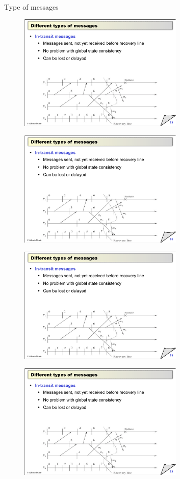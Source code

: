\begin{frame}{Type of messages}
\begin{overprint}
\begin{figure}
	\includegraphics[width=0.7\textwidth,page=4]{messages}
\end{figure}
\begin{figure}
	\includegraphics[width=0.7\textwidth,page=5]{messages}
\end{figure}
\begin{figure}
	\includegraphics[width=0.7\textwidth,page=6]{messages}
\end{figure}
\begin{figure}
	\includegraphics[width=0.7\textwidth,page=7]{messages}

\end{figure}
\end{overprint}
\end{frame}
